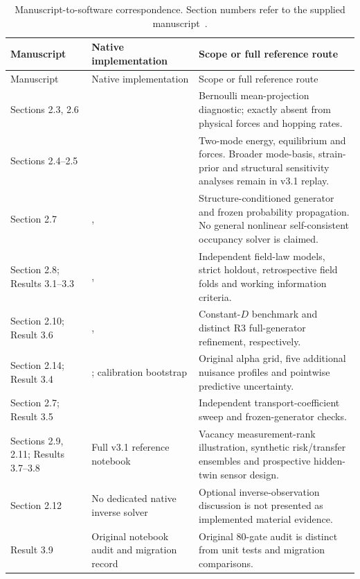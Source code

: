 \documentclass[11pt,a4paper]{article}
\newcommand{\code}[1]{\texttt{\detokenize{#1}}}
\begin{document}
\begin{longtable}{@{}p{.19\linewidth}p{.34\linewidth}p{.40\linewidth}@{}}
\caption{Manuscript-to-software correspondence. Section numbers refer to the supplied manuscript~\cite{manuscript}.}\label{tab:correspondence}\\
\toprule Manuscript & Native implementation & Scope or full reference route\\\midrule\endfirsthead
\toprule Manuscript & Native implementation & Scope or full reference route\\\midrule\endhead
Sections 2.3, 2.6 & \code{RecoverabilityDiagnostic} & Bernoulli mean-projection diagnostic; exactly absent from physical forces and hopping rates.\\
Sections 2.4--2.5 & \code{StructuralModel} & Two-mode energy, equilibrium and forces. Broader mode-basis, strain-prior and structural sensitivity analyses remain in v3.1 replay.\\
Section 2.7 & \code{TransportModel}, \code{FrozenGenerator} & Structure-conditioned generator and frozen probability propagation. No general nonlinear self-consistent occupancy solver is claimed.\\
Section 2.8; Results 3.1--3.3 & \code{RelaxationModel}, \code{CalibrationStudy} & Independent field-law models, strict holdout, retrospective field folds and working information criteria.\\
Section 2.10; Result 3.6 & \code{ContinuumStudy}, \code{RefinementStudy} & Constant-$D$ benchmark and distinct R3 full-generator refinement, respectively.\\
Section 2.14; Result 3.4 & \code{IdentifiabilityStudy}; calibration bootstrap & Original alpha grid, five additional nuisance profiles and pointwise predictive uncertainty.\\
Section 2.7; Result 3.5 & \code{TransportSensitivityStudy} & Independent transport-coefficient sweep and frozen-generator checks.\\
Sections 2.9, 2.11; Results 3.7--3.8 & Full v3.1 reference notebook & Vacancy measurement-rank illustration, synthetic risk/transfer ensembles and prospective hidden-twin sensor design.\\
Section 2.12 & No dedicated native inverse solver & Optional inverse-observation discussion is not presented as implemented material evidence.\\
Result 3.9 & Original notebook audit and migration record & Original 80-gate audit is distinct from unit tests and migration comparisons.\\
\bottomrule
\end{longtable}
\end{document}
